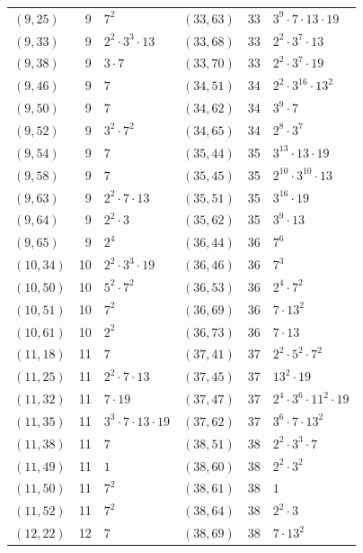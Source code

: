 \documentclass[11pt]{article}
\begin{document}
\begin{longtable}{@{}lrl@{\qquad}lrl@{}}
$(9,25)$ & 9 & $7^{2}$ & $(33,63)$ & 33 & $3^{9}\cdot 7\cdot 13\cdot 19$\\
$(9,33)$ & 9 & $2^{2}\cdot 3^{3}\cdot 13$ & $(33,68)$ & 33 & $2^{2}\cdot 3^{7}\cdot 13$\\
$(9,38)$ & 9 & $3\cdot 7$ & $(33,70)$ & 33 & $2^{2}\cdot 3^{7}\cdot 19$\\
$(9,46)$ & 9 & $7$ & $(34,51)$ & 34 & $2^{2}\cdot 3^{16}\cdot 13^{2}$\\
$(9,50)$ & 9 & $7$ & $(34,62)$ & 34 & $3^{9}\cdot 7$\\
$(9,52)$ & 9 & $3^{2}\cdot 7^{2}$ & $(34,65)$ & 34 & $2^{8}\cdot 3^{7}$\\
$(9,54)$ & 9 & $7$ & $(35,44)$ & 35 & $3^{13}\cdot 13\cdot 19$\\
$(9,58)$ & 9 & $7$ & $(35,45)$ & 35 & $2^{10}\cdot 3^{10}\cdot 13$\\
$(9,63)$ & 9 & $2^{2}\cdot 7\cdot 13$ & $(35,51)$ & 35 & $3^{16}\cdot 19$\\
$(9,64)$ & 9 & $2^{2}\cdot 3$ & $(35,62)$ & 35 & $3^{9}\cdot 13$\\
$(9,65)$ & 9 & $2^{4}$ & $(36,44)$ & 36 & $7^{6}$\\
$(10,34)$ & 10 & $2^{2}\cdot 3^{3}\cdot 19$ & $(36,46)$ & 36 & $7^{3}$\\
$(10,50)$ & 10 & $5^{2}\cdot 7^{2}$ & $(36,53)$ & 36 & $2^{4}\cdot 7^{2}$\\
$(10,51)$ & 10 & $7^{2}$ & $(36,69)$ & 36 & $7\cdot 13^{2}$\\
$(10,61)$ & 10 & $2^{2}$ & $(36,73)$ & 36 & $7\cdot 13$\\
$(11,18)$ & 11 & $7$ & $(37,41)$ & 37 & $2^{2}\cdot 5^{2}\cdot 7^{2}$\\
$(11,25)$ & 11 & $2^{2}\cdot 7\cdot 13$ & $(37,45)$ & 37 & $13^{2}\cdot 19$\\
$(11,32)$ & 11 & $7\cdot 19$ & $(37,47)$ & 37 & $2^{4}\cdot 3^{6}\cdot 11^{2}\cdot 19$\\
$(11,35)$ & 11 & $3^{3}\cdot 7\cdot 13\cdot 19$ & $(37,62)$ & 37 & $3^{6}\cdot 7\cdot 13^{2}$\\
$(11,38)$ & 11 & $7$ & $(38,51)$ & 38 & $2^{2}\cdot 3^{3}\cdot 7$\\
$(11,49)$ & 11 & $1$ & $(38,60)$ & 38 & $2^{2}\cdot 3^{2}$\\
$(11,50)$ & 11 & $7^{2}$ & $(38,61)$ & 38 & $1$\\
$(11,52)$ & 11 & $7^{2}$ & $(38,64)$ & 38 & $2^{2}\cdot 3$\\
$(12,22)$ & 12 & $7$ & $(38,69)$ & 38 & $7\cdot 13^{2}$\\

\end{longtable}
\end{document}
